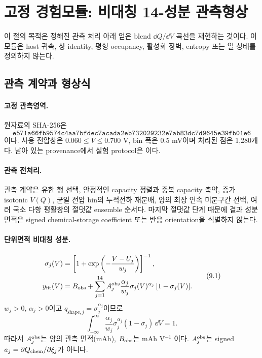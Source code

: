\section{고정 경험모듈: 비대칭 14-성분 관측형상}
\label{EMP-SKEW14}

이 절의 목적은 정해진 관측 처리 아래 얻은 blend
$\dd Q/\dd V$ 곡선을 재현하는 것이다. 이 모듈은 host 귀속, 상
identity, 평형 occupancy, 활성화 장벽, entropy 또는 열 상태를
정의하지 않는다.

\subsection{관측 계약과 형상식}

\paragraph{ 고정 관측영역.}
원자료의 SHA-256은
\[
\texttt{e571a66fb9574c4aa7bfdec7acada2eb732029232e7ab83dc7d9645e39fb01e6}
\]
이다. 사용 전압창은 $0.060\le V\le0.700$ V, bin 폭은
$0.5$ mV이며 처리된 점은 1,280개다. 남아 있는 provenance에서
실험 protocol은 이다.

\paragraph{ 관측 전처리.}
관측 계약은 유한 행 선택, 안정적인 capacity 정렬과 중복 capacity
축약, 증가 isotonic $V(Q)$, 균일 전압 bin의 누적전하 재분배,
양의 최장 연속 미분구간 선택, 여러 국소 다항 평활창의 절댓값
ensemble 순서다. 마지막 절댓값 단계 때문에 결과 성분 면적은
signed chemical-storage coefficient 또는 반응 orientation을
식별하지 않는다.

\paragraph{ 단위면적 비대칭 성분.}
\[
\begin{split}
\sigma_j(V)&=\left[1+
 \exp\left(-\frac{V-U_j}{w_j}\right)\right]^{-1},\\
y_{\mathrm{fit}}(V)&=B_{\mathrm{obs}}+\sum_{j=1}^{14}
A_j^{\mathrm{obs}}\frac{\alpha_j}{w_j}
\sigma_j(V)^{\alpha_j}\,[1-\sigma_j(V)] .
\end{split}
\tag{9.1}
\]
$w_j>0$, $\alpha_j>0$이고
$q_{\mathrm{shape},j}=\sigma_j^{\alpha_j}$이므로
\[
\int_{-\infty}^{\infty}
\frac{\alpha_j}{w_j}\sigma_j^{\alpha_j}(1-\sigma_j)\,\dd V=1.
\tag{9.2}
\]
따라서 $A_j^{\mathrm{obs}}$는 양의 관측 면적(mAh), $B_{\mathrm{obs}}$는 mAh V$^{-1}$
이다. $A_j^{\mathrm{obs}}$는 signed $a_j=\partial Q_{\mathrm{chem}}/\partial\xi_j$가
아니다.

